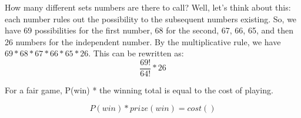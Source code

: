 \documentclass[]{article}
\begin{document}
How many different sets numbers are there to call? Well, let's think about this: each number rules out the possibility to the subsequent numbers existing.
So, we have 69 possibilities for the first number, 68 for the second, 67, 66, 65, and then 26 numbers for the independent number.
By the multiplicative rule, we have $69*68*67*66*65*26$.
This can be rewritten as:
\[\frac{69!}{64!}*26\]

For a fair game, P(win) * the winning total is equal to the cost of playing.

\begin{equation*}
	P(win) * prize(win) = cost()
\end{equation*}
\end{document}
